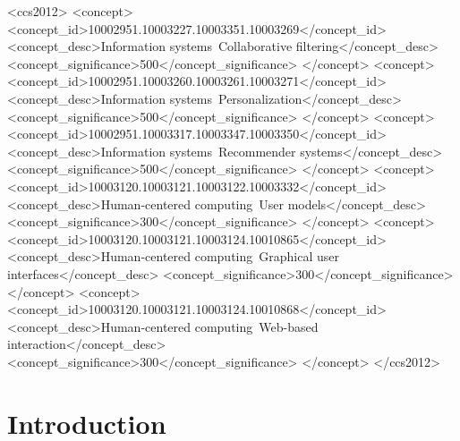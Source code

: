 \documentclass[format=acmsmall, review=false, screen=true]{acmart}
\begin{document}
%
%
 \begin{CCSXML}
<ccs2012>
<concept>
<concept_id>10002951.10003227.10003351.10003269</concept_id>
<concept_desc>Information systems~Collaborative filtering</concept_desc>
<concept_significance>500</concept_significance>
</concept>
<concept>
<concept_id>10002951.10003260.10003261.10003271</concept_id>
<concept_desc>Information systems~Personalization</concept_desc>
<concept_significance>500</concept_significance>
</concept>
<concept>
<concept_id>10002951.10003317.10003347.10003350</concept_id>
<concept_desc>Information systems~Recommender systems</concept_desc>
<concept_significance>500</concept_significance>
</concept>
<concept>
<concept_id>10003120.10003121.10003122.10003332</concept_id>
<concept_desc>Human-centered computing~User models</concept_desc>
<concept_significance>300</concept_significance>
</concept>
<concept>
<concept_id>10003120.10003121.10003124.10010865</concept_id>
<concept_desc>Human-centered computing~Graphical user interfaces</concept_desc>
<concept_significance>300</concept_significance>
</concept>
<concept>
<concept_id>10003120.10003121.10003124.10010868</concept_id>
<concept_desc>Human-centered computing~Web-based interaction</concept_desc>
<concept_significance>300</concept_significance>
</concept>
</ccs2012>
\end{CCSXML}

%
%


\maketitle




\section{Introduction}

\end{document}
